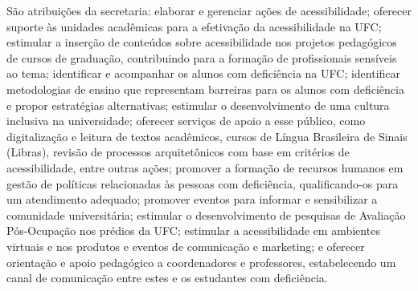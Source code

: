 São atribuições da secretaria: elaborar e gerenciar ações de acessibilidade; oferecer suporte às unidades acadêmicas para a efetivação da acessibilidade na UFC; estimular a inserção de conteúdos sobre acessibilidade nos projetos pedagógicos de cursos de graduação, contribuindo para a formação de profissionais sensíveis ao tema; identificar e acompanhar os alunos com deficiência na UFC; identificar metodologias de ensino que representam barreiras para os alunos com deficiência e propor estratégias alternativas; estimular o desenvolvimento de uma cultura inclusiva na universidade; oferecer serviços de apoio a esse público, como digitalização e leitura de textos acadêmicos, cursos de Língua Brasileira de Sinais (Libras), revisão de processos arquitetônicos com base em critérios de acessibilidade, entre outras ações; promover a formação de recursos humanos em gestão de políticas relacionadas às pessoas com deficiência, qualificando-os para um atendimento adequado; promover eventos para informar e sensibilizar a comunidade universitária; estimular o desenvolvimento de pesquisas de Avaliação Pós-Ocupação nos prédios da UFC; estimular a acessibilidade em ambientes virtuais e nos produtos e eventos de comunicação e marketing; e oferecer orientação e apoio pedagógico a coordenadores e professores, estabelecendo um canal de comunicação entre estes e os estudantes com deficiência.


